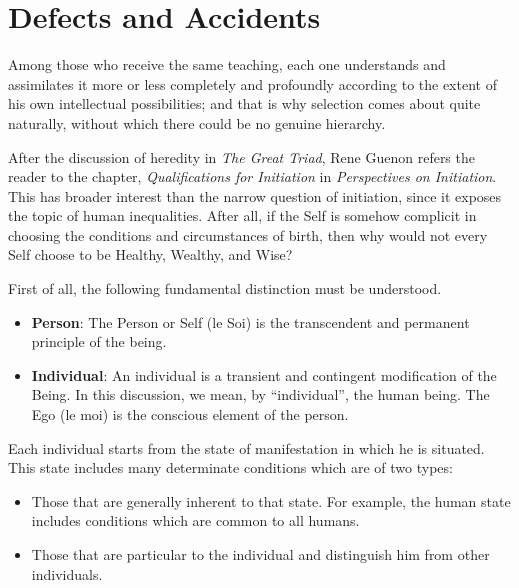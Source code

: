 \section{Defects and Accidents}

\begin{quotex}
Among those who receive the same teaching, each one understands and assimilates it more or less completely and profoundly according to the extent of his own intellectual possibilities; and that is why selection comes about quite naturally, without which there could be no genuine hierarchy.
\end{quotex}


After the discussion of heredity in \emph{The Great Triad}, Rene Guenon refers the reader to the chapter, \emph{Qualifications for Initiation} in \emph{Perspectives on Initiation}. This has broader interest than the narrow question of initiation, since it exposes the topic of human inequalities. After all, if the Self is somehow complicit in choosing the conditions and circumstances of birth, then why would not every Self choose to be Healthy, Wealthy, and Wise?

First of all, the following fundamental distinction must be understood.

\begin{itemize}


\item \textbf{Person}: The Person or Self (le Soi) is the transcendent and permanent principle of the being.

\item \textbf{Individual}: An individual is a transient and contingent modification of the Being. In this discussion, we mean, by ``individual'', the human being. The Ego (le moi) is the conscious element of the person.
\end{itemize}


Each individual starts from the state of manifestation in which he is situated. This state includes many determinate conditions which are of two types:

\begin{itemize}


\item Those that are generally inherent to that state. For example, the human state includes conditions which are common to all humans.

\item Those that are particular to the individual and distinguish him from other individuals.
\end{itemize}


